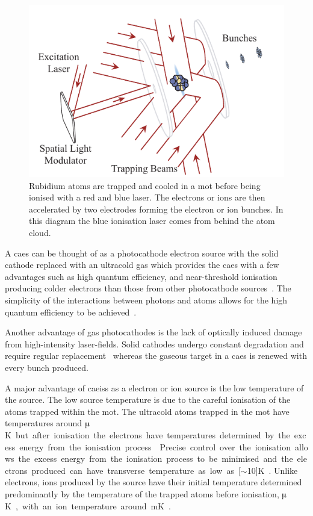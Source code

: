 \begin{figure}
    \center
    \includegraphics{0intro/Figs/simple_caeis_schem.pdf}
    \caption[Simplified cold atom ion and electron source schematic.]{Rubidium atoms are trapped and cooled in a \gls{mot} before being ionised with a red and blue laser. The electrons or ions are then accelerated by two electrodes forming the electron or ion bunches. In this diagram the blue ionisation laser comes from behind the atom cloud.}
    \label{figure:simple_caeis_schem}
\end{figure}

A \gls{caes} can be thought of as a photocathode electron source with the solid cathode replaced with an ultracold gas which provides the \gls{caes} with a few advantages such as high quantum efficiency, and near-threshold ionisation producing colder electrons than those from other photocathode sources~\cite{engelen_effective_2014}.
The simplicity of the interactions between photons and atoms allows for the high quantum efficiency to be achieved~\cite{baranov_field_1994}.

Another advantage of gas photocathodes is the lack of optically induced damage from high-intensity laser-fields.
Solid cathodes undergo constant degradation and require regular replacement~\cite{dowell_results_1995} whereas the gaseous target in a \gls{caes} is renewed with every bunch produced.

A major advantage of \glspl{caeis} as a electron or ion source is the low temperature of the source.
The low source temperature is due to the careful ionisation of the atoms trapped within the \gls{mot}.
The ultracold atoms trapped in the \gls{mot} have temperatures around \unit[100]{$\muup$K} but after ionisation the electrons have temperatures determined by the excess energy from the ionisation process~\cite{engelen_high-coherence_2013,engelen_analytical_2014,sparkes_high-coherence_2014,speirs_identification_2017}.
Precise control over the ionisation allows the excess energy from the ionisation process to be minimised and the electrons produced can have transverse temperature as low as \unit[$\sim$10]{K}~\cite{saliba_spatial_2012}.
Unlike electrons, ions produced by the source have their initial temperature determined predominantly by the temperature of the trapped atoms before ionisation, \unit[100]{$\muup$K}, with an ion temperature around \unit[1]{mK}~\cite{debernardi_measurement_2011,murphy_detailed_2014}.


